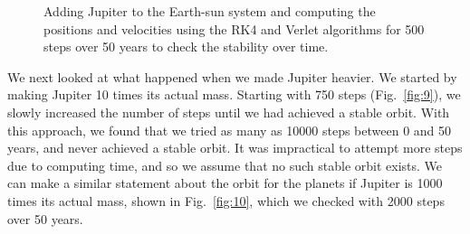 \documentclass[12pt]{article}
\numberwithin{equation}{section}
\begin{document}
\begin{figure}[h]
\begin{center}
\begin{subfigure}
\end{subfigure} 
\caption{Adding Jupiter to the Earth-sun system and computing the positions and velocities using the RK4 and Verlet algorithms for 500 steps over 50 years to check the stability over time.}
\label{fig:8}
\end{center}
\end{figure}

\par We next looked at what happened when we made Jupiter heavier.  We started by making Jupiter 10 times its actual mass.  Starting with 750 steps (Fig.~\ref{fig:9}), we slowly increased the number of steps until we had achieved a stable orbit.   With this approach, we found that we tried as many as 10000 steps between 0 and 50 years, and never achieved a stable orbit.  It was impractical to attempt more steps due to computing time, and so we assume that no such stable orbit exists.  We can make a similar statement about the orbit for the planets if Jupiter is 1000 times its actual mass, shown in Fig.~\ref{fig:10}, which we checked with 2000 steps over 50 years.
\end{document}
